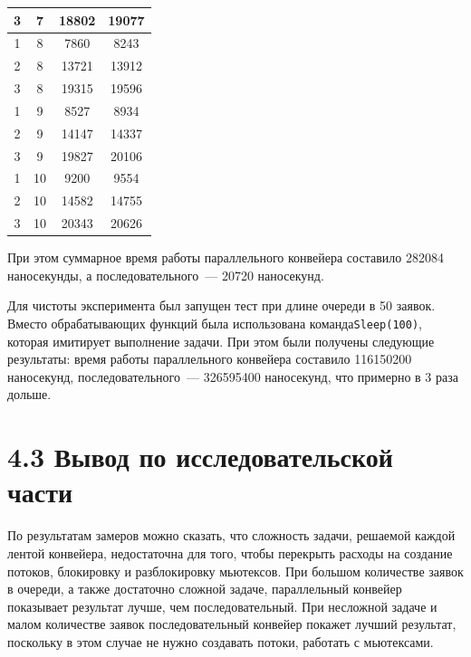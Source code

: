 \documentclass[12pt, a4paper]{report}
\begin{document}
\begin{table} [H]
\begin{tabular}[l]{|c c c c|}
			3 & 7 & 18802 & 19077  \\\hline
			
			1 & 8 & 7860 & 8243  \\ 
			
			2 & 8 & 13721 & 13912  \\ 
			
			3 & 8 & 19315 & 19596  \\\hline
			
			1 & 9 & 8527 & 8934  \\ 
			
			2 & 9 & 14147 & 14337  \\ 
			
			3 & 9 & 19827 & 20106  \\\hline
			
			1 & 10 & 9200 & 9554  \\ 
			
			2 & 10 & 14582 & 14755  \\ 
			
			3 & 10 & 20343 & 20626  \\\hline
		\end{tabular}
	\end{table}
	
	При этом суммарное время работы параллельного конвейера составило 282084 наносекунды, а последовательного~--- 20720 наносекунд.
	
	Для чистоты эксперимента был запущен тест при длине очереди в 50 заявок. Вместо обрабатывающих функций была использована команда\newline \verb|Sleep(100)|, которая имитирует выполнение задачи. При этом были получены следующие результаты: время работы параллельного конвейера составило 116150200 наносекунд, последовательного~--- 326595400 наносекунд, что примерно в 3 раза дольше.
	
	\section*{4.3 Вывод по исследовательской части}
	
	По результатам замеров можно сказать, что сложность задачи, решаемой каждой лентой конвейера, недостаточна для того, чтобы перекрыть расходы на создание потоков, блокировку и разблокировку мьютексов. При большом количестве заявок в очереди, а также достаточно сложной задаче, параллельный конвейер показывает результат лучше, чем последовательный. При несложной задаче и малом количестве заявок последовательный конвейер покажет лучший результат, поскольку в этом случае не нужно создавать потоки, работать с мьютексами.
	
\end{document}
